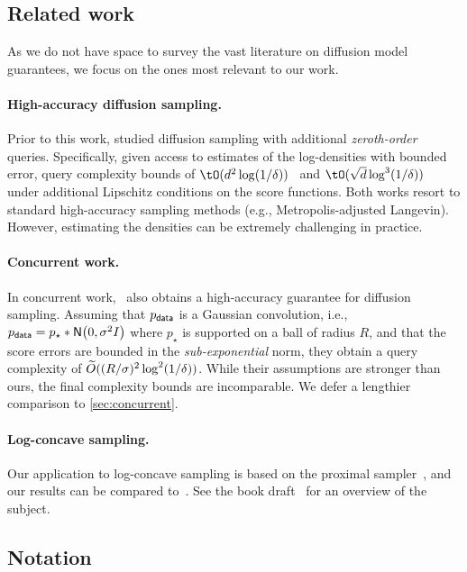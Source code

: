 \documentclass{article} %
\let\oldparagraph\paragraph
\renewcommand{\paragraph}[1]{\oldparagraph{#1.}}
\newcommand{\normal}[1]{\mathsf{N}\prn*{#1}}
\begin{document}
\subsection{Related work}

As we do not have space to survey the vast literature on diffusion model guarantees, we focus on the ones most relevant to our work.

\paragraph{High-accuracy diffusion sampling}
Prior to this work, \citet{huang2024reverse,wainwright2025score} studied diffusion sampling with additional \emph{zeroth-order} queries. Specifically, given access to estimates of the log-densities with bounded error, query complexity bounds of $\tO(d^2\log(1/\delta))$~\citep{huang2024reverse} and $\tO(\sqrt{d}\log^3(1/\delta))$~\citep{wainwright2025score} under additional Lipschitz conditions on the score functions. Both works resort to standard high-accuracy sampling methods (e.g., Metropolis-adjusted Langevin). However, estimating the densities can be extremely challenging in practice.

\paragraph{Concurrent work} In concurrent work,~\citet{gatmiry2026high} also obtains a high-accuracy guarantee for diffusion sampling.
Assuming that $p_{\mathsf{data}}$ is a Gaussian convolution, i.e., $\pdata = p_\star * \normal{0,\sigma^2 I}$ where $p_\star$ is supported on a ball of radius $R$, and that the score errors are bounded in the \emph{sub-exponential} norm, they obtain a query complexity of $\widetilde{O}((R/\sigma)^2 \log^2(1/\delta))$.
While their assumptions are stronger than ours, the final complexity bounds are incomparable. We defer a lengthier comparison to
\cref{sec:concurrent}.

\paragraph{Log-concave sampling}
Our application to log-concave sampling is based on the proximal sampler~\citep{LeeSheTia21RGO, Chen+22ProxSampler}, and our results can be compared to~\citet{AltChe24Warm, FanYuaChe23ImprovedProx}.
See the book draft~\citet{Chewi26Book} for an overview of the subject.

\subsection{Notation}
\end{document}
